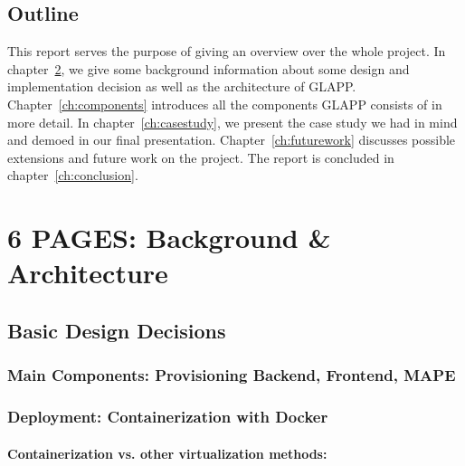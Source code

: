 \documentclass{seal_thesis}
\begin{document}
\section{Outline}
This report serves the purpose of giving an overview over the whole project.
In chapter~\ref{ch:background}, we give some background information about some design and implementation decision as well as the architecture of GLAPP.
Chapter~\ref{ch:components} introduces all the components GLAPP consists of in more detail.
In chapter~\ref{ch:casestudy}, we present the case study we had in mind and demoed in our final presentation.
Chapter~\ref{ch:futurework} discusses possible extensions and future work on the project.
The report is concluded in chapter~\ref{ch:conclusion}.



\chapter{6 PAGES: Background \& Architecture}\label{ch:background}

\section{Basic Design Decisions}

\subsection{Main Components: Provisioning Backend, Frontend, MAPE}

\subsection{Deployment: Containerization with Docker}
\subsubsection{Containerization vs. other virtualization methods:}
\end{document}
